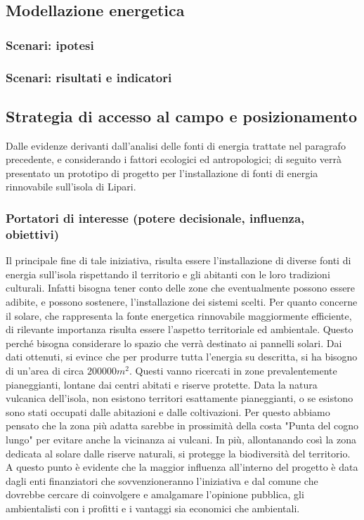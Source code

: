 \documentclass[fleqn,10pt]{SelfArx} %
\begin{document}
\subsection{Modellazione energetica}
\subsubsection{Scenari: ipotesi}
\subsubsection{Scenari: risultati e indicatori}
\subsection{Strategia di accesso al campo e posizionamento}
Dalle evidenze derivanti dall'analisi delle fonti di energia trattate nel paragrafo precedente, e considerando i fattori ecologici ed antropologici;  di  seguito verrà presentato un prototipo di progetto per l'installazione di fonti di energia rinnovabile sull'isola di Lipari.

\subsubsection{Portatori di interesse (potere decisionale, influenza, obiettivi)}
Il principale fine di tale iniziativa, risulta essere l'installazione di diverse fonti di energia sull'isola rispettando il territorio e gli abitanti con le loro tradizioni culturali. 
Infatti bisogna tener conto delle zone che eventualmente possono essere adibite, e possono sostenere, l'installazione dei sistemi scelti.
Per quanto concerne il solare, che rappresenta la fonte energetica rinnovabile maggiormente efficiente, di rilevante importanza risulta essere l'aspetto territoriale ed ambientale. 
Questo perché bisogna considerare lo spazio che verrà destinato ai pannelli solari. 
Dai dati ottenuti, si evince che per produrre tutta l'energia su descritta, si ha bisogno di un'area di circa $200000 m^2$. 
Questi vanno ricercati in zone prevalentemente pianeggianti, lontane dai centri abitati e riserve protette. 
Data la natura vulcanica dell'isola, non esistono territori esattamente pianeggianti, o se esistono sono stati occupati dalle abitazioni e dalle coltivazioni. 
Per questo abbiamo pensato che la zona più adatta sarebbe in prossimità della costa "Punta del cogno lungo" per evitare anche la vicinanza ai vulcani. 
In più, allontanando così la zona dedicata al solare dalle riserve naturali, si protegge la biodiversità del territorio.
A questo punto è evidente che la maggior influenza all'interno del progetto è data dagli enti finanziatori che sovvenzioneranno l'iniziativa e dal comune che dovrebbe cercare di coinvolgere e amalgamare l'opinione pubblica, gli ambientalisti con i profitti e i vantaggi sia economici che ambientali.
\end{document}
